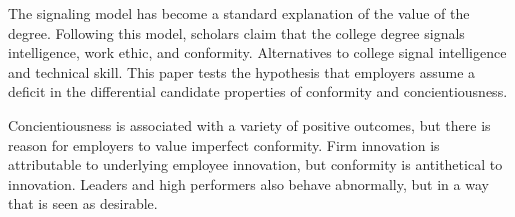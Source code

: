 \documentclass[review]{elsarticle}
\begin{document}



The signaling model has become a standard explanation of the value of the degree.
Following this model, scholars claim that the college degree signals intelligence, work ethic, and conformity\cite{caplan2018case}.
Alternatives to college signal intelligence and technical skill.
This paper tests the hypothesis that employers assume a deficit in the differential candidate properties of conformity and concientiousness.



Concientiousness is associated with a variety of positive outcomes,
but there is reason for employers to value imperfect conformity.
Firm innovation is attributable to underlying employee innovation, but conformity is antithetical to innovation.
Leaders and high performers also behave abnormally, but in a way that is seen as desirable.
\end{document}
